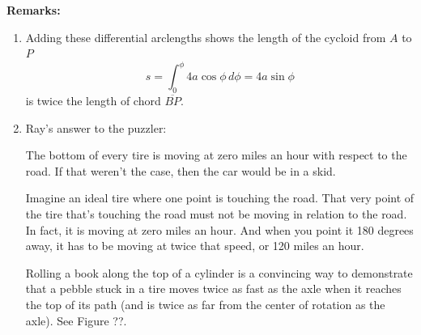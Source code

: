 \documentclass{ximera}
\begin{document}
{\bf Remarks:} 
\begin{enumerate}
\item Adding these differential arclengths shows the length of the cycloid from $A$ to $P$ 
\[
      s =\int_0^\phi 4a\cos\phi \, d\phi = 4a\sin\phi                   %
\]
is twice the length of chord $\overline{BP}$.


\item Ray's answer to the puzzler:

\small{The bottom of every tire is moving at zero miles an hour with respect to the road. If that weren't the case, then the car would be in a skid.

Imagine an ideal tire where one point is touching the road. That very point of the tire that's touching the road must not be moving in relation to the road. In fact, it is moving at zero miles an hour. And when you point it 180 degrees away, it has to be moving at twice that speed, or 120 miles an hour.}


Rolling a book along the top of a cylinder is a convincing way to demonstrate that a pebble stuck in a tire moves twice as fast as the axle when it reaches the top of its path (and is twice as far from the center of rotation as the axle).  See Figure ??. %




\end{enumerate}
\end{document}
